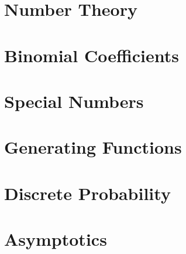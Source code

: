 \documentclass{book}
\begin{document}
\chapter{Number Theory}

\chapter{Binomial Coefficients}

\chapter{Special Numbers}

\chapter{Generating Functions}

\chapter{Discrete Probability}

\chapter{Asymptotics}
\end{document}

